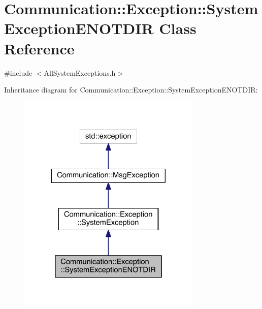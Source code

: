 \hypertarget{class_communication_1_1_exception_1_1_system_exception_e_n_o_t_d_i_r}{}\section{Communication\+:\+:Exception\+:\+:System\+Exception\+E\+N\+O\+T\+D\+I\+R Class Reference}
\label{class_communication_1_1_exception_1_1_system_exception_e_n_o_t_d_i_r}


{\ttfamily \#include $<$All\+System\+Exceptions.\+h$>$}



Inheritance diagram for Communication\+:\+:Exception\+:\+:System\+Exception\+E\+N\+O\+T\+D\+I\+R\+:\nopagebreak
\begin{figure}[H]
\begin{center}
\leavevmode
\includegraphics[width=248pt]{class_communication_1_1_exception_1_1_system_exception_e_n_o_t_d_i_r__inherit__graph}
\end{center}
\end{figure}


